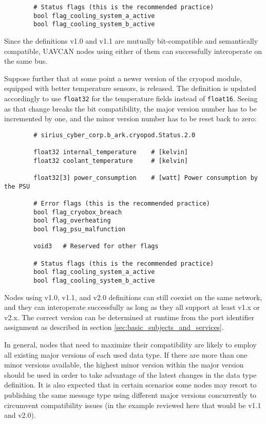 \begin{remark}[breakable]
\begin{verbatim}
        # Status flags (this is the recommended practice)
        bool flag_cooling_system_a_active
        bool flag_cooling_system_b_active
    \end{verbatim}

    Since the definitions v1.0 and v1.1 are mutually bit-compatible and semantically compatible,
    UAVCAN nodes using either of them can successfully interoperate on the same bus.

    Suppose further that at some point a newer version of the cryopod module,
    equipped with better temperature sensors, is released.
    The definition is updated accordingly to use \verb|float32| for the temperature fields instead of \verb|float16|.
    Seeing as that change breaks the bit compatibility,
    the major version number has to be incremented by one,
    and the minor version number has to be reset back to zero:

    \begin{verbatim}
        # sirius_cyber_corp.b_ark.cryopod.Status.2.0

        float32 internal_temperature    # [kelvin]
        float32 coolant_temperature     # [kelvin]

        float32[3] power_consumption    # [watt] Power consumption by the PSU

        # Error flags (this is the recommended practice)
        bool flag_cryobox_breach
        bool flag_overheating
        bool flag_psu_malfunction

        void3   # Reserved for other flags

        # Status flags (this is the recommended practice)
        bool flag_cooling_system_a_active
        bool flag_cooling_system_b_active
    \end{verbatim}

    Nodes using v1.0, v1.1, and v2.0 definitions can still coexist on the same network,
    and they can interoperate successfully as long as they all support at least v1.x or v2.x.
    The correct version can be determined at runtime from the port identifier assignment as described in section
    \ref{sec:basic_subjects_and_services}.

    In general, nodes that need to maximize their compatibility are likely to employ all existing major versions of
    each used data type.
    If there are more than one minor versions available, the highest minor version within the major version should
    be used in order to take advantage of the latest changes in the data type definition.
    It is also expected that in certain scenarios some nodes may resort to publishing the same message type
    using different major versions concurrently to circumvent compatibility issues
    (in the example reviewed here that would be v1.1 and v2.0).
\end{remark}

